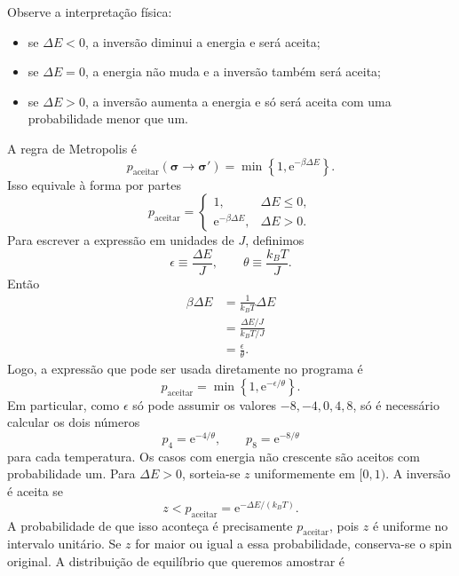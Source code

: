 \documentclass[12pt,a4paper]{article}
\newcommand{\e}[1]{\mathrm{e}^{#1}}
\newcommand{\thetaT}{\theta}
\begin{document}
%
Observe a interpretação física:
%
\begin{itemize}
    \item se $\Delta E<0$, a inversão diminui a energia e será aceita;
    \item se $\Delta E=0$, a energia não muda e a inversão também será aceita;
    \item se $\Delta E>0$, a inversão aumenta a energia e só será aceita com uma probabilidade menor que um.
\end{itemize}
%
A regra de Metropolis é
%
\begin{equation}
    p_{\mathrm{aceitar}}(\bm\sigma\to\bm\sigma')
    =\min\left\{1,\e{-\beta\Delta E}\right\}.
    \label{eq:metropolisbeta}
\end{equation}
%
Isso equivale à forma por partes
%
\begin{equation}
    p_{\mathrm{aceitar}}=
    \begin{cases}
        1, & \Delta E\leq0,\\[2mm]
        \e{-\beta\Delta E}, & \Delta E>0.
    \end{cases}
\end{equation}
%
Para escrever a expressão em unidades de $J$, definimos
%
\[
    \epsilon\equiv\frac{\Delta E}{J},\qquad
    \thetaT\equiv\frac{k_BT}{J}.
\]
%
Então
%
\begin{align}
    \beta\Delta E
    &=\frac{1}{k_BT}\Delta E\\
    &=\frac{\Delta E/J}{k_BT/J}\\
    &=\frac{\epsilon}{\thetaT}.
\end{align}
%
Logo, a expressão que pode ser usada diretamente no programa é
%
\begin{equation}
    p_{\mathrm{aceitar}}=\min\left\{1,\e{-\epsilon/\thetaT}\right\}.
    \label{eq:metropolis_theta}
\end{equation}
%
Em particular, como $\epsilon$ só pode assumir os valores $-8,-4,0,4,8$, só é necessário calcular os dois números
%
\begin{equation}
    p_4=\e{-4/\thetaT},\qquad p_8=\e{-8/\thetaT}
\end{equation}
%
para cada temperatura. Os casos com energia não crescente são aceitos com probabilidade um. Para $\Delta E>0$, sorteia-se $z$ uniformemente em $[0,1)$. A inversão é aceita se
%
\begin{equation}
    z<p_{\mathrm{aceitar}}=\e{-\Delta E/(k_BT)}.
\end{equation}
%
A probabilidade de que isso aconteça é precisamente $p_{\mathrm{aceitar}}$, pois $z$ é uniforme no intervalo unitário. Se $z$ for maior ou igual a essa probabilidade, conserva-se o spin original. A distribuição de equilíbrio que queremos amostrar é
\end{document}
